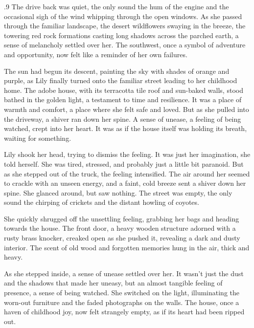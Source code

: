 \documentclass{article}
\newcommand{\Agentsroomzs}{\textsc{Agents' Room$_{ZS}$}}
\begin{document}
\begin{tcolorbox}[colback=white, colframe=gray!30!white, coltitle=black, parskip=5mm, title=
    \textbf{System output: \Agentsroomzs}, breakable]
\begin{spacing}{.9}
The drive back was quiet, the only sound the hum of the engine and the occasional sigh of the wind whipping through the open windows.  As she passed through the familiar landscape, the desert wildflowers swaying in the breeze, the towering red rock formations casting long shadows across the parched earth, a sense of melancholy settled over her.  The southwest, once a symbol of adventure and opportunity, now felt like a reminder of her own failures.\\\par

The sun had begun its descent, painting the sky with shades of orange and purple, as Lily finally turned onto the familiar street leading to her childhood home.  The adobe house, with its terracotta tile roof and sun-baked walls, stood bathed in the golden light, a testament to time and resilience.  It was a place of warmth and comfort, a place where she felt safe and loved.  But as she pulled into the driveway, a shiver ran down her spine.  A sense of unease, a feeling of being watched, crept into her heart.  It was as if the house itself was holding its breath, waiting for something.\\\par

Lily shook her head, trying to dismiss the feeling.  It was just her imagination, she told herself.  She was tired, stressed, and probably just a little bit paranoid.  But as she stepped out of the truck, the feeling intensified.  The air around her seemed to crackle with an unseen energy, and a faint, cold breeze sent a shiver down her spine.  She glanced around, but saw nothing.  The street was empty, the only sound the chirping of crickets and the distant howling of coyotes.\\\par

She quickly shrugged off the unsettling feeling, grabbing her bags and heading towards the house.  The front door, a heavy wooden structure adorned with a rusty brass knocker, creaked open as she pushed it, revealing a dark and dusty interior.  The scent of old wood and forgotten memories hung in the air, thick and heavy.\\\par

As she stepped inside, a sense of unease settled over her.  It wasn't just the dust and the shadows that made her uneasy, but an almost tangible feeling of presence, a sense of being watched.  She switched on the light, illuminating the worn-out furniture and the faded photographs on the walls.  The house, once a haven of childhood joy, now felt strangely empty, as if its heart had been ripped out.\\\par


\end{spacing}
\end{tcolorbox}
\end{document}
